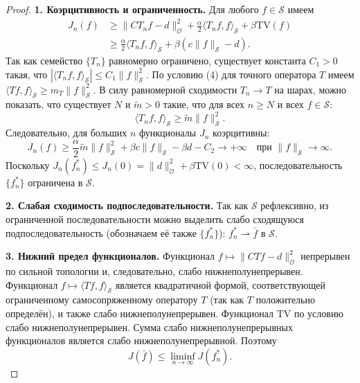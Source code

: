 \documentclass[sn-mathphys-num]{bst/sn-jnl}
\theoremstyle{thmstylethree}
\theoremstyle{thmstyletwo}
\theoremstyle{thmstyleone}
\begin{document}
\begin{proof}
\textbf{1. Коэрцитивность и ограниченность.}
Для любого $f \in \mathcal{S}$ имеем
\begin{align*}
    J_n(f) &\ge \|C T_n f - d\|_{\mathcal{O}}^2 + \frac{\alpha}{2} \langle T_n f, f\rangle_{\mathcal{S}} + \beta \mathrm{TV}(f) \\
    &\ge \frac{\alpha}{2} \langle T_n f, f\rangle_{\mathcal{S}} + \beta (c \|f\|_{\mathcal{S}} - d).
\end{align*}
Так как семейство $\{T_n\}$ равномерно ограничено, существует константа $C_1>0$ такая, что $|\langle T_n f, f\rangle_{\mathcal{S}}| \le C_1 \|f\|_{\mathcal{S}}^2$.
По условию (4) для точного оператора $T$ имеем $\langle T f, f\rangle_{\mathcal{S}} \ge m_T \|f\|_{\mathcal{S}}^2$.
В силу равномерной сходимости $T_n \to T$ на шарах, можно показать, что существует $N$ и $\tilde{m}>0$ такие, что для всех $n \ge N$ и всех $f \in \mathcal{S}$:
\begin{equation}
    \langle T_n f, f\rangle_{\mathcal{S}} \ge \tilde{m} \|f\|_{\mathcal{S}}^2.
\end{equation}
Следовательно, для больших $n$ функционалы $J_n$ коэрцитивны:
\begin{equation}
    J_n(f) \ge \frac{\alpha}{2} \tilde{m} \|f\|_{\mathcal{S}}^2 + \beta c \|f\|_{\mathcal{S}} - \beta d - C_2 \to +\infty \quad \text{при } \|f\|_{\mathcal{S}} \to \infty.
\end{equation}
Поскольку $J_n(f_n^*) \le J_n(0) = \|d\|_{\mathcal{O}}^2 + \beta \mathrm{TV}(0) < \infty$, последовательность $\{f_n^*\}$ ограничена в $\mathcal{S}$.

\textbf{2. Слабая сходимость подпоследовательности.}
Так как $\mathcal{S}$ рефлексивно, из ограниченной последовательности можно выделить слабо сходящуюся подпоследовательность (обозначаем её также $\{f_n^*\}$): $f_n^* \rightharpoonup \bar f$ в $\mathcal{S}$.

\textbf{3. Нижний предел функционалов.}
Функционал $f \mapsto \|C T f - d\|_{\mathcal{O}}^2$ непрерывен по сильной топологии и, следовательно, слабо нижнеполунепрерывен.
Функционал $f \mapsto \langle T f, f\rangle_{\mathcal{S}}$ является квадратичной формой, соответствующей ограниченному самосопряженному оператору $T$ (так как $T$ положительно определён), и также слабо нижнеполунепрерывен.
Функционал $\mathrm{TV}$ по условию слабо нижнеполунепрерывен.
Сумма слабо нижнеполунепрерывных функционалов является слабо нижнеполунепрерывной. Поэтому
\begin{equation}
    J(\bar f) \le \liminf_{n\to\infty} J(f_n^*).
\end{equation}


\end{proof}
\end{document}
